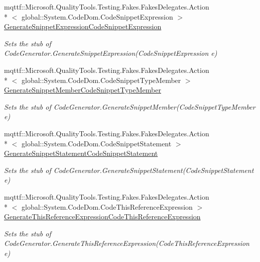 \begin{DoxyCompactItemize}
mqttf\-::\-Microsoft.\-Quality\-Tools.\-Testing.\-Fakes.\-Fakes\-Delegates.\-Action\\*
$<$ global\-::\-System.\-Code\-Dom.\-Code\-Snippet\-Expression $>$ \hyperlink{class_system_1_1_code_dom_1_1_compiler_1_1_fakes_1_1_stub_code_generator_af5f4f08feede98d3cbcbd554e4c7f39a}{Generate\-Snippet\-Expression\-Code\-Snippet\-Expression}
\begin{DoxyCompactList}\small\item\em Sets the stub of Code\-Generator.\-Generate\-Snippet\-Expression(\-Code\-Snippet\-Expression e)\end{DoxyCompactList}\item 
mqttf\-::\-Microsoft.\-Quality\-Tools.\-Testing.\-Fakes.\-Fakes\-Delegates.\-Action\\*
$<$ global\-::\-System.\-Code\-Dom.\-Code\-Snippet\-Type\-Member $>$ \hyperlink{class_system_1_1_code_dom_1_1_compiler_1_1_fakes_1_1_stub_code_generator_af8987b74dc7e337abb4317778fbcab95}{Generate\-Snippet\-Member\-Code\-Snippet\-Type\-Member}
\begin{DoxyCompactList}\small\item\em Sets the stub of Code\-Generator.\-Generate\-Snippet\-Member(\-Code\-Snippet\-Type\-Member e)\end{DoxyCompactList}\item 
mqttf\-::\-Microsoft.\-Quality\-Tools.\-Testing.\-Fakes.\-Fakes\-Delegates.\-Action\\*
$<$ global\-::\-System.\-Code\-Dom.\-Code\-Snippet\-Statement $>$ \hyperlink{class_system_1_1_code_dom_1_1_compiler_1_1_fakes_1_1_stub_code_generator_ad0f2090ce40126720f417a7842c21d62}{Generate\-Snippet\-Statement\-Code\-Snippet\-Statement}
\begin{DoxyCompactList}\small\item\em Sets the stub of Code\-Generator.\-Generate\-Snippet\-Statement(\-Code\-Snippet\-Statement e)\end{DoxyCompactList}\item 
mqttf\-::\-Microsoft.\-Quality\-Tools.\-Testing.\-Fakes.\-Fakes\-Delegates.\-Action\\*
$<$ global\-::\-System.\-Code\-Dom.\-Code\-This\-Reference\-Expression $>$ \hyperlink{class_system_1_1_code_dom_1_1_compiler_1_1_fakes_1_1_stub_code_generator_ae6aa4b35bfbd56fb776b732a190e1515}{Generate\-This\-Reference\-Expression\-Code\-This\-Reference\-Expression}
\begin{DoxyCompactList}\small\item\em Sets the stub of Code\-Generator.\-Generate\-This\-Reference\-Expression(\-Code\-This\-Reference\-Expression e)\end{DoxyCompactList}\item 

\end{DoxyCompactItemize}
